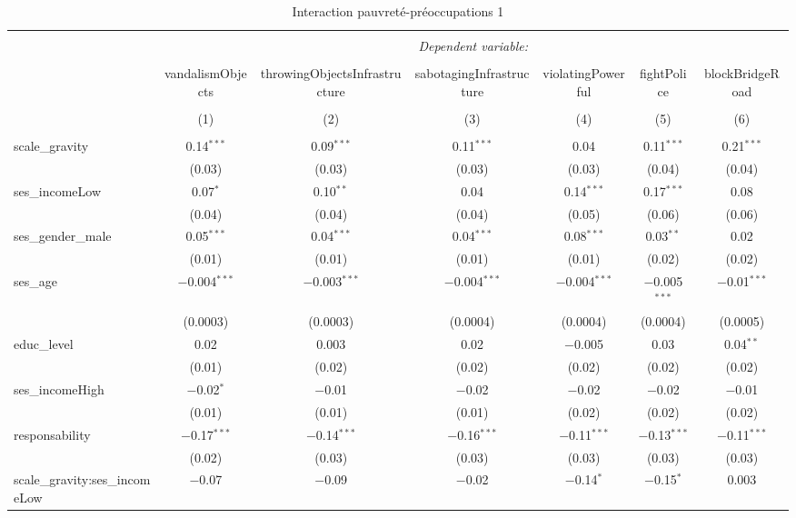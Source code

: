 \documentclass[
]{article}
\begin{document}
\begin{sidewaystable}[!htbp] \centering 
  \caption{Interaction pauvreté-préoccupations 1} 
  \label{} 
\begin{tabular}{@{\extracolsep{1pt}}lcccccc} 
\\[-1.8ex]\hline 
\hline \\[-1.8ex] 
 & \multicolumn{6}{c}{\textit{Dependent variable:}} \\ 
\cline{2-7} 
\\[-1.8ex] & vandalismObjects & throwingObjectsInfrastructure & sabotagingInfrastructure & violatingPowerful & fightPolice & blockBridgeRoad \\ 
\\[-1.8ex] & (1) & (2) & (3) & (4) & (5) & (6)\\ 
\hline \\[-1.8ex] 
 scale\_gravity & 0.14$^{***}$ & 0.09$^{***}$ & 0.11$^{***}$ & 0.04 & 0.11$^{***}$ & 0.21$^{***}$ \\ 
  & (0.03) & (0.03) & (0.03) & (0.03) & (0.04) & (0.04) \\ 
  ses\_incomeLow & 0.07$^{*}$ & 0.10$^{**}$ & 0.04 & 0.14$^{***}$ & 0.17$^{***}$ & 0.08 \\ 
  & (0.04) & (0.04) & (0.04) & (0.05) & (0.06) & (0.06) \\ 
  ses\_gender\_male & 0.05$^{***}$ & 0.04$^{***}$ & 0.04$^{***}$ & 0.08$^{***}$ & 0.03$^{**}$ & 0.02 \\ 
  & (0.01) & (0.01) & (0.01) & (0.01) & (0.02) & (0.02) \\ 
  ses\_age & $-$0.004$^{***}$ & $-$0.003$^{***}$ & $-$0.004$^{***}$ & $-$0.004$^{***}$ & $-$0.005$^{***}$ & $-$0.01$^{***}$ \\ 
  & (0.0003) & (0.0003) & (0.0004) & (0.0004) & (0.0004) & (0.0005) \\ 
  educ\_level & 0.02 & 0.003 & 0.02 & $-$0.005 & 0.03 & 0.04$^{**}$ \\ 
  & (0.01) & (0.02) & (0.02) & (0.02) & (0.02) & (0.02) \\ 
  ses\_incomeHigh & $-$0.02$^{*}$ & $-$0.01 & $-$0.02 & $-$0.02 & $-$0.02 & $-$0.01 \\ 
  & (0.01) & (0.01) & (0.01) & (0.02) & (0.02) & (0.02) \\ 
  responsability & $-$0.17$^{***}$ & $-$0.14$^{***}$ & $-$0.16$^{***}$ & $-$0.11$^{***}$ & $-$0.13$^{***}$ & $-$0.11$^{***}$ \\ 
  & (0.02) & (0.03) & (0.03) & (0.03) & (0.03) & (0.03) \\ 
  scale\_gravity:ses\_incomeLow & $-$0.07 & $-$0.09 & $-$0.02 & $-$0.14$^{*}$ & $-$0.15$^{*}$ & 0.003 \\ 

\end{tabular}
\end{sidewaystable}
\end{document}
